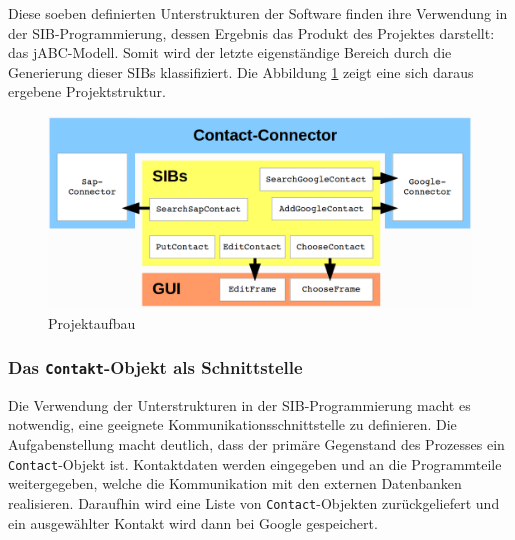 Diese soeben definierten Unterstrukturen der Software finden ihre Verwendung in der SIB-Programmierung, dessen
 Ergebnis das Produkt des Projektes darstellt: das jABC-Modell.
Somit wird der letzte eigenständige Bereich durch die Generierung dieser SIBs klassifiziert.
Die Abbildung \ref{fig:projektaufbau} zeigt eine sich daraus ergebene Projektstruktur.

\begin{figure}[h!t]
\includegraphics[width=\textwidth]{Bilder/projekt_aufbau.png}
\caption{Projektaufbau}
\label{fig:projektaufbau}
\end{figure}
	
\subsubsection{Das \lstinline{Contakt}-Objekt als Schnittstelle}
Die Verwendung der Unterstrukturen in der SIB-Programmierung macht es notwendig, eine geeignete
 Kommunikationsschnittstelle zu definieren.
Die Aufgabenstellung macht deutlich, dass der primäre Gegenstand des Prozesses ein \lstinline{Contact}-Objekt ist.
Kontaktdaten werden eingegeben und an die Programmteile weitergegeben, welche die Kommunikation mit den
 externen Datenbanken realisieren.
Daraufhin wird eine Liste von \lstinline{Contact}-Objekten zurückgeliefert und ein ausgewählter Kontakt wird
 dann bei Google gespeichert.
 
